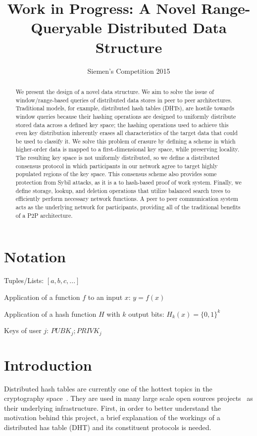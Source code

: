 \documentclass[10pt]{IEEEtran}
\title{Work in Progress: A Novel Range-Queryable Distributed Data Structure}
\author{Siemen's Competition 2015}
\date{\vspace{-5ex}}
\begin{document}
\maketitle

\begin{abstract}
We present the design of a novel data structure. We aim to solve the issue of window/range-based queries of distributed data stores in peer to peer architectures. Traditional models, for example, distributed hash tables (DHTs), are hostile towards window queries because their hashing operations are designed to uniformly distribute stored data across a defined key space; the hashing operations used to achieve this even key distribution inherently erases all characteristics of the target data that could be used to classify it. We solve this problem of erasure by defining a scheme in which higher-order data is mapped to a first-dimensional key space, while preserving locality. The resulting key space is not uniformly distributed, so we define a distributed consensus protocol in which participants in our network agree to target highly populated regions of the key space. This consensus scheme also provides some protection from Sybil attacks, as it is a to hash-based proof of work system. Finally, we define storage, lookup, and deletion operations that utilize balanced search trees to efficiently perform necessary network functions. A peer to peer communication system acts as the underlying network for participants, providing all of the traditional benefits of a P2P architecture.
\end{abstract}


\section{Notation}

\noindent Tuples/Lists: $[a,b,c,...]$

\noindent Application of a function $f$ to an input $x$: $y=f(x)$

\noindent Application of a hash function $H$ with $k$ output bits: $H_{k}(x) = \{0,1\}^k$

\noindent Keys of user $j$: $ PUBK_j; PRIVK_j $

 
\section{Introduction}
\par Distributed hash tables are currently one of the hottest topics in the cryptography space~\cite{Stoica:2001dj,Rowstron:2001ea,Ratnasamy:2001wn}. They are used in many large scale open sources projects~\cite{Freitas:2013tb,Xu:2010vs,Perfitt:2010fh} as their underlying infrastructure. First, in order to better understand the motivation behind this project, a brief explanation of the workings of a distributed has table (DHT) and its constituent protocols is needed.
\end{document}
